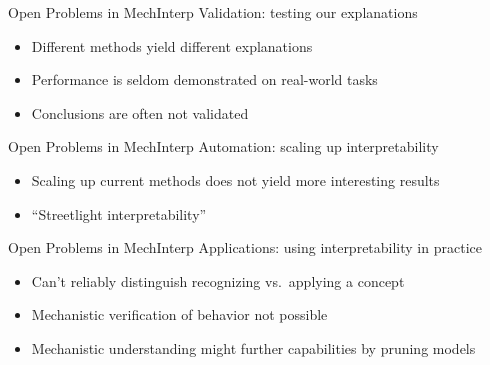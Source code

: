 \begin{frame}{Open Problems in MechInterp}
Validation: testing our explanations
\begin{itemize}
\item Different methods yield different explanations
\item Performance is seldom demonstrated on real-world tasks
\item Conclusions are often not validated
\end{itemize}
\end{frame}

\begin{frame}{Open Problems in MechInterp}
Automation: scaling up interpretability
\begin{itemize}
\item Scaling up current methods does not yield more interesting results
\item ``Streetlight interpretability''
\end{itemize}
\end{frame}

\begin{frame}{Open Problems in MechInterp}
Applications: using interpretability in practice
\begin{itemize}
\item Can't reliably distinguish recognizing vs.\ applying a concept
\item Mechanistic verification of behavior not possible
\item Mechanistic understanding might further capabilities by pruning models
\end{itemize}
\end{frame}

